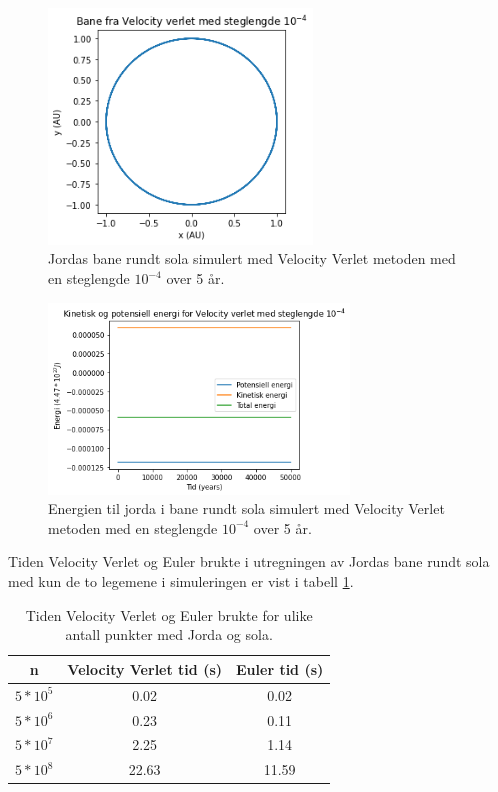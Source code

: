 \documentclass[reprint,english,notitlepage]{revtex4-1}
\begin{document}
	\begin{figure}[H]
		\includegraphics[width=70mm]{../Code/Figures/vverlet4.png}
		\caption{Jordas bane rundt sola simulert med Velocity Verlet metoden med en steglengde $10^{-4}$ over 5 år.}
		\label{fig:vverlet4}
	\end{figure}
	
	\begin{figure}[H]
		\includegraphics[width=80mm]{../Code/Figures/vverleten4.png}
		\caption{Energien til jorda i bane rundt sola simulert med Velocity Verlet metoden med en steglengde $10^{-4}$ over 5 år.}
		\label{fig:vverleten4}
	\end{figure}
	Tiden Velocity Verlet og Euler brukte i utregningen av Jordas bane rundt sola med kun de to legemene i simuleringen er vist i tabell \ref{tab:time}.

	\begin{table}[H]
		\begin{center}
			\caption{Tiden Velocity Verlet og Euler brukte for ulike antall punkter med Jorda og sola.}
			\label{tab:time}
			\begin{tabular}{|c|c|c|} \hline
				\textbf{n} & \textbf{Velocity Verlet tid (s)} & \textbf{Euler tid (s)} \\ \hline
				$5*10^5$ & 0.02 & 0.02 \\
				$5*10^6$ & 0.23 & 0.11 \\
				$5*10^7$ & 2.25 & 1.14 \\
				$5*10^8$ & 22.63 & 11.59 \\ \hline
			\end{tabular}
		\end{center}
	\end{table}
\end{document}
